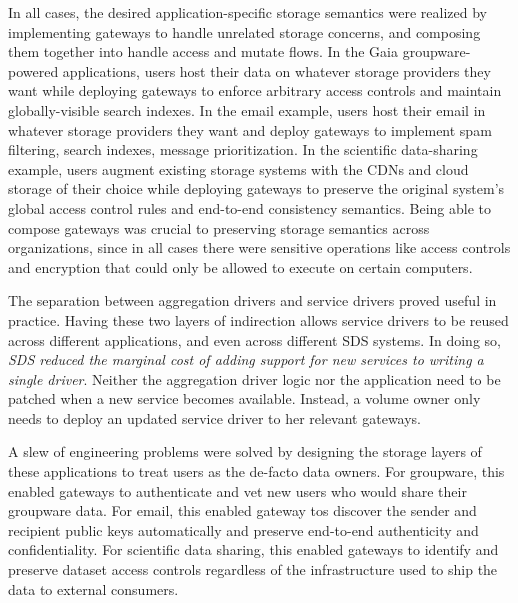 In all cases, the desired application-specific storage semantics were realized
by implementing gateways to handle unrelated storage concerns, and composing them
together into handle access and mutate flows.
In the Gaia groupware-powered applications, users host their data on whatever storage providers they want
while deploying gateways to enforce arbitrary access controls and maintain globally-visible search
indexes.  In the email example, users host
their email in whatever storage providers they want and deploy gateways to
implement spam filtering, search indexes, message prioritization.  In the scientific
data-sharing example, users augment existing storage systems with the CDNs and cloud
storage of their choice while deploying gateways to preserve the original system's global access
control rules and end-to-end consistency semantics.  Being able to compose
gateways was crucial to preserving storage semantics across organizations, since
in all cases there were sensitive operations like access controls and encryption
that could only be allowed to execute on certain computers.

The separation between aggregation drivers and service drivers proved useful in
practice.  Having these two layers of indirection allows service
drivers to be reused across different applications, and even across different SDS systems.
In doing so, \emph{SDS reduced the marginal cost of adding support for new
services to writing a single driver}.
Neither the aggregation driver logic nor the application need to be
patched when a new service becomes available.  Instead, a volume owner only
needs to deploy an updated service driver to her relevant gateways.

A slew of engineering problems were solved by
designing the storage layers of these applications to treat users as the
de-facto data owners.
For groupware, this enabled gateways to authenticate and vet new users who would
share their groupware data.  For email, this enabled gateway tos discover the
sender and recipient public keys automatically and preserve end-to-end
authenticity and confidentiality.  For scientific data sharing,
this enabled gateways to identify and preserve dataset access controls regardless of the infrastructure used
to ship the data to external consumers.

